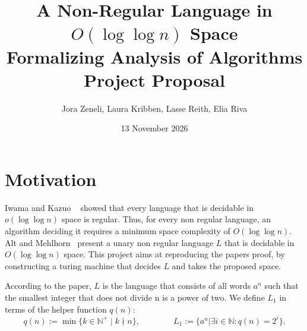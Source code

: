 \documentclass[UTF8]{article}
\begin{document}
\title{
  A Non-Regular Language in $O(\log \log n)$ Space \\
    \large
        Formalizing Analysis of Algorithms \\
        Project Proposal}

\author{Jora Zeneli, Laura Kribben, Lasse Reith, Elia Riva}

\date{13 November 2026}

\maketitle
\newpage
\section{Motivation}
Iwama and Kazuo ~\cite{iwamaregular} showed that every language that is decidable in $o(\log \log n)$ space is regular. 
Thus, for every non regular language, an algorithm deciding it requires a minimum space complexity of $O(\log \log n)$.
Alt and Mehlhorn~\cite{Lang-OneSymbAlph-LogLogn-HM-1975} present a unary non regular language $L$ that is decidable in $O(\log \log n)$ space. 
This project aims at reproducing the papers proof, by constructing a turing machine that decides $L$ and takes the proposed space.

According to the paper, $L$ is the language that consists of all words $a^n$ such that the smallest integer that does not divide n is a power of two.
We define $L_1$ in terms of the helper function $q(n)$:
$$ {q(n) := \min\{ k\in\mathbb N^+ \mid k\nmid n\}}, \qquad \qquad  L_1 := \{a^n | \exists i \in \mathbb N : q(n) = 2^i  \}.$$

\end{document}
